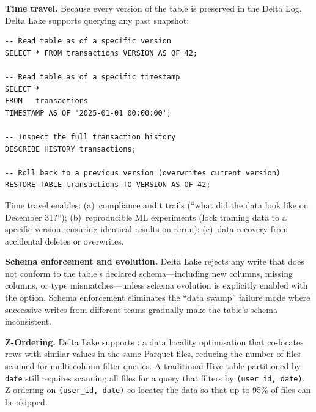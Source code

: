 \textbf{Time travel.} Because every version of the table is preserved
in the Delta Log, Delta Lake supports querying any past snapshot:

\begin{lstlisting}[style=hiveql, caption={Delta Lake time travel queries}]
-- Read table as of a specific version
SELECT * FROM transactions VERSION AS OF 42;

-- Read table as of a specific timestamp
SELECT *
FROM   transactions
TIMESTAMP AS OF '2025-01-01 00:00:00';

-- Inspect the full transaction history
DESCRIBE HISTORY transactions;

-- Roll back to a previous version (overwrites current version)
RESTORE TABLE transactions TO VERSION AS OF 42;
\end{lstlisting}

Time travel enables: (a)~compliance audit trails (``what did the data look
like on December 31?''); (b)~reproducible ML experiments (lock training
data to a specific version, ensuring identical results on rerun);
(c)~data recovery from accidental deletes or overwrites.

\textbf{Schema enforcement and evolution.} Delta Lake rejects any write
that does not conform to the table's declared schema---including new
columns, missing columns, or type mismatches---unless schema evolution
is explicitly enabled with the  option. Schema enforcement
eliminates the ``data swamp'' failure mode where successive writes from
different teams gradually make the table's schema inconsistent.

\textbf{Z-Ordering.} Delta Lake supports : a data
locality optimisation that co-locates rows with similar values in the
same Parquet files, reducing the number of files scanned for multi-column
filter queries. A traditional Hive table partitioned by \texttt{date}
still requires scanning all files for a query that filters by
\texttt{(user\_id, date)}. Z-ordering on \texttt{(user\_id, date)}
co-locates the data so that up to 95\% of files can be skipped.

